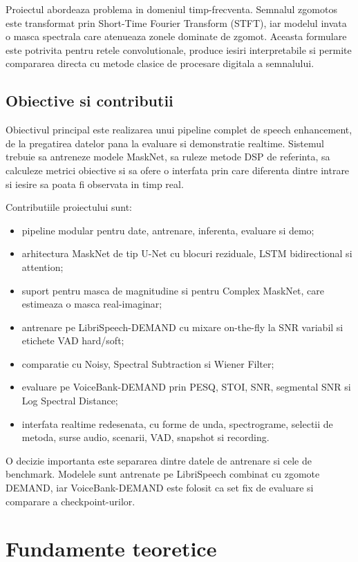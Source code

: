 \documentclass[12pt,a4paper]{report}
\begin{document}
Proiectul abordeaza problema in domeniul timp-frecventa. Semnalul zgomotos este
transformat prin Short-Time Fourier Transform (STFT), iar modelul invata o
masca spectrala care atenueaza zonele dominate de zgomot. Aceasta formulare
este potrivita pentru retele convolutionale, produce iesiri interpretabile si
permite compararea directa cu metode clasice de procesare digitala a
semnalului.

\section{Obiective si contributii}

Obiectivul principal este realizarea unui pipeline complet de speech
enhancement, de la pregatirea datelor pana la evaluare si demonstratie
realtime. Sistemul trebuie sa antreneze modele MaskNet, sa ruleze metode DSP de
referinta, sa calculeze metrici obiective si sa ofere o interfata prin care
diferenta dintre intrare si iesire sa poata fi observata in timp real.

Contributiile proiectului sunt:
\begin{itemize}
    \item pipeline modular pentru date, antrenare, inferenta, evaluare si demo;
    \item arhitectura MaskNet de tip U-Net cu blocuri reziduale, LSTM
    bidirectional si attention;
    \item suport pentru masca de magnitudine si pentru Complex MaskNet, care
    estimeaza o masca real-imaginar;
    \item antrenare pe LibriSpeech-DEMAND cu mixare on-the-fly la SNR variabil
    si etichete VAD hard/soft;
    \item comparatie cu Noisy, Spectral Subtraction si Wiener Filter;
    \item evaluare pe VoiceBank-DEMAND prin PESQ, STOI, SNR, segmental SNR si
    Log Spectral Distance;
    \item interfata realtime redesenata, cu forme de unda, spectrograme,
    selectii de metoda, surse audio, scenarii, VAD, snapshot si recording.
\end{itemize}

O decizie importanta este separarea dintre datele de antrenare si cele de
benchmark. Modelele sunt antrenate pe LibriSpeech combinat cu zgomote DEMAND,
iar VoiceBank-DEMAND este folosit ca set fix de evaluare si comparare a
checkpoint-urilor.

\chapter{Fundamente teoretice}
\end{document}
